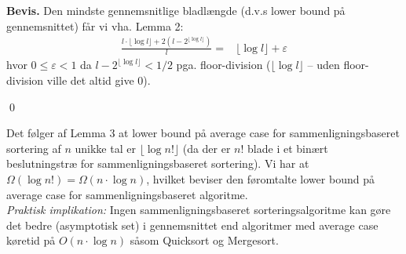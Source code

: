 \textbf{Bevis.} Den mindste gennemsnitlige bladlængde (d.v.s lower bound på gennemsnittet) får vi vha. Lemma 2:
\begin{align*}
	\frac{l \cdot \lfloor \log l \rfloor + 2(l-2^{\lfloor \log l \rfloor})}{l} =& \lfloor \log l \rfloor + \varepsilon
\end{align*}
hvor $0 \le \varepsilon < 1$ da $l-2^{\lfloor \log l \rfloor}<1/2$ pga. floor-division ($\lfloor \log l \rfloor$ -- uden floor-division ville det altid give 0). 
\begin{flushright}
	\qed
\end{flushright} 

Det følger af Lemma 3 at lower bound på average case for sammenligningsbaseret sortering af $n$ unikke tal er $\lfloor \log n! \rfloor$ (da der er $n!$ blade i et binært beslutningstræ for sammenligningsbaseret sortering). Vi har at $\Omega(\log n!)=\Omega(n \cdot \log n)$, hvilket beviser den føromtalte lower bound på average case for sammenligningsbaseret algoritme. \\

\textit{Praktisk implikation: } Ingen sammenligningsbaseret sorteringsalgoritme kan gøre det bedre (asymptotisk set) i gennemsnittet end algoritmer med average case køretid på $O(n \cdot \log n)$ såsom Quicksort og Mergesort.  




